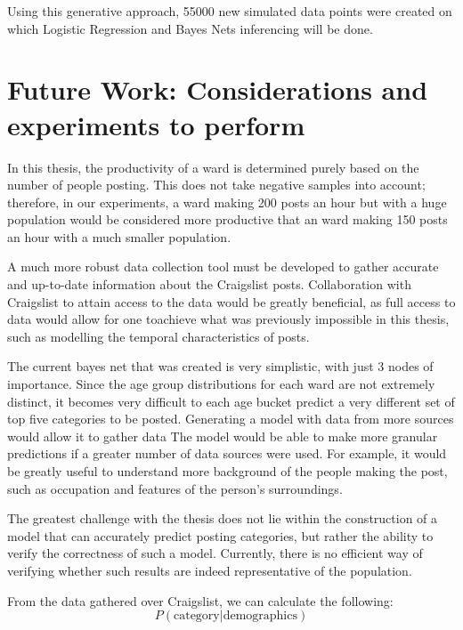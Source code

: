 \documentclass[12pt]{article}
\begin{document}
   Using this generative approach, 55000 new simulated data points were created on which Logistic Regression and Bayes Nets inferencing will be done.  

\newpage
\section{Future Work: Considerations and experiments to perform}
In this thesis, the productivity of a ward is determined purely based on the number of people posting. This does not take negative samples into account; therefore, in our experiments, a ward making 200 posts an hour but with a huge population would be considered more productive that an ward making 150 posts an hour with a much smaller population. 

A much more robust data collection tool must be developed to gather accurate and up-to-date information about the Craigslist posts. Collaboration with Craigslist to attain access to the data would be greatly beneficial, as full access to data would allow for one toachieve what was previously impossible in this thesis, such as modelling the temporal characteristics of posts. 

The current bayes net that was created is very simplistic, with just 3 nodes of importance. Since the age group distributions for each ward are not extremely distinct, it becomes very difficult to each age bucket predict a very different set of top five categories to be posted. Generating a model with data from more sources would allow it to gather data  The model would be able to make more granular predictions if a greater number of data sources were used. For example, it would be greatly useful to understand more background of the people making the post, such as occupation and features of the person's surroundings. 



   The greatest challenge with the thesis does not lie within the construction of a model that can accurately predict posting categories, but rather the ability to verify the correctness of such a model. Currently, there is no efficient way of verifying whether such results are indeed representative of the population.

   From the data gathered over Craigslist, we can calculate the following:
   \[P(\text{category} | \text{demographics})\]
\end{document}
